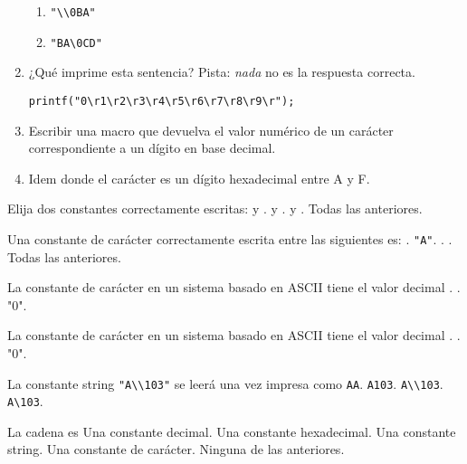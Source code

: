 \begin{enumerate}
\begin{enumerate}[label=\alph*.]
\item \lstinline{"\\0BA"}
\item \lstinline{"BA\0CD"}
	\end{enumerate}
\item ¿Qué imprime esta sentencia? Pista: \textit{nada} no es la respuesta correcta.
\begin{lstlisting}
printf("0\r1\r2\r3\r4\r5\r6\r7\r8\r9\r");
\end{lstlisting}
\item Escribir una macro que devuelva el valor numérico de un carácter correspondiente a un dígito en base decimal.
\item Idem donde el carácter es un dígito hexadecimal entre A y F.
\end{enumerate}


\begin{preguntas}

\question Elija dos constantes correctamente escritas:
\correctchoice {} y .
\choice {} y .
\choice {} y .
\choice Todas las anteriores.

\question Una constante de carácter correctamente escrita entre las siguientes es:
\choice {}.
\choice \lstinline{"A"}.
\correctchoice {}.
\choice {}.
\choice Todas las anteriores.

\question La constante de carácter  en un sistema basado en ASCII tiene el valor decimal
.
.
\choice "0".

\question La constante de carácter  en un sistema basado en ASCII tiene el valor decimal
.
.
\choice "0".

\question La constante string \lstinline{"A\\103"} se leerá una vez impresa como
\choice \verb+AA+.
\choice \verb+A103+.
\choice \verb+A\\103+.
\correctchoice \verb+A\103+.

\question La cadena  es
\choice Una constante decimal.
\choice Una constante hexadecimal.
\choice Una constante string.
\choice Una constante de carácter.
\correctchoice Ninguna de las anteriores.
\end{preguntas}
